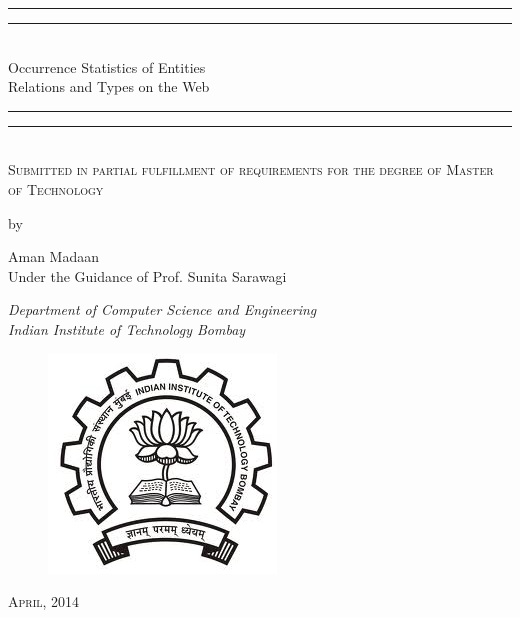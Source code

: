 \documentclass[a4paper,11pt]{report}
\begin{document}
\begin{titlepage}
    \centering
    \vspace*{\baselineskip}
    \rule{\textwidth}{1.6pt}\vspace*{-\baselineskip}\vspace*{2pt}
    \rule{\textwidth}{0.4pt}\\[\baselineskip]
    {\LARGE Occurrence Statistics of Entities \\[0.3\baselineskip] Relations and Types on the Web}\\[0.2\baselineskip]
    \rule{\textwidth}{0.4pt}\vspace*{-\baselineskip}\vspace{3.2pt}
    \rule{\textwidth}{1.6pt}\\[\baselineskip]
    \scshape
    Submitted in partial fulfillment of requirements for the degree of
    Master of Technology \par
    \vspace*{1\baselineskip}
     by \\[\baselineskip]
    {\Large Aman Madaan \vspace*{1\baselineskip} \\ Under the Guidance of Prof. Sunita Sarawagi\par}
    {\vspace*{19\baselineskip} \itshape Department of Computer Science and Engineering \\ Indian Institute of Technology Bombay\par}
    \vfill
    \begin{figure}[h]
 \centering
 \includegraphics[bb=0 0 229 220,scale=0.35]{./iitb_logo.jpg}
\end{figure}

    {\scshape April, 2014} \\
    {\large }\par
  \end{titlepage}
\tableofcontents
\end{document}
